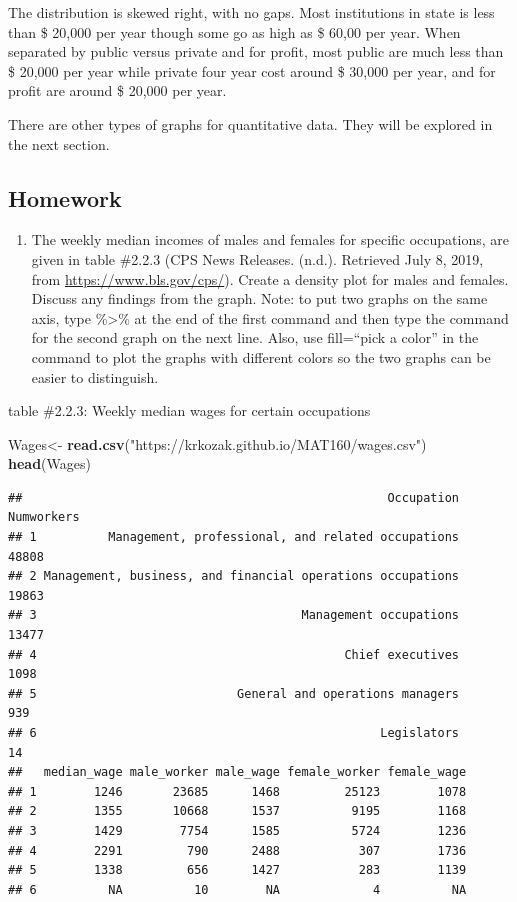 \documentclass[
]{book}
\newenvironment{Shaded}{\begin{snugshade}}{\end{snugshade}}
\newcommand{\KeywordTok}[1]{\textcolor[rgb]{0.13,0.29,0.53}{\textbf{#1}}}
\newcommand{\NormalTok}[1]{#1}
\newcommand{\StringTok}[1]{\textcolor[rgb]{0.31,0.60,0.02}{#1}}
\providecommand{\tightlist}{%
  \setlength{\itemsep}{0pt}\setlength{\parskip}{0pt}}
\begin{document}
The distribution is skewed right, with no gaps. Most institutions in state is less than \$ 20,000 per year though some go as high as \$ 60,00 per year. When separated by public versus private and for profit, most public are much less than \$ 20,000 per year while private four year cost around \$ 30,000 per year, and for profit are around \$ 20,000 per year.

There are other types of graphs for quantitative data. They will be explored in the next section.

\hypertarget{homework-1}{%
\subsection{Homework}\label{homework-1}}

\begin{enumerate}
\def\labelenumi{\arabic{enumi}.}
\tightlist
\item
  The weekly median incomes of males and females for specific occupations, are given in table \#2.2.3 (CPS News Releases. (n.d.). Retrieved July 8, 2019, from \url{https://www.bls.gov/cps/}). Create a density plot for males and females. Discuss any findings from the graph. Note: to put two graphs on the same axis, type \%\textgreater\% at the end of the first command and then type the command for the second graph on the next line. Also, use fill=``pick a color'' in the command to plot the graphs with different colors so the two graphs can be easier to distinguish.
\end{enumerate}

table \#2.2.3: Weekly median wages for certain occupations

\begin{Shaded}
\begin{Highlighting}[]
\NormalTok{Wages<-}\StringTok{ }\KeywordTok{read.csv}\NormalTok{(}\StringTok{"https://krkozak.github.io/MAT160/wages.csv"}\NormalTok{)}
\KeywordTok{head}\NormalTok{(Wages)}
\end{Highlighting}
\end{Shaded}

\begin{verbatim}
##                                                   Occupation Numworkers
## 1          Management, professional, and related occupations      48808
## 2 Management, business, and financial operations occupations      19863
## 3                                     Management occupations      13477
## 4                                           Chief executives       1098
## 5                            General and operations managers        939
## 6                                                Legislators         14
##   median_wage male_worker male_wage female_worker female_wage
## 1        1246       23685      1468         25123        1078
## 2        1355       10668      1537          9195        1168
## 3        1429        7754      1585          5724        1236
## 4        2291         790      2488           307        1736
## 5        1338         656      1427           283        1139
## 6          NA          10        NA             4          NA
\end{verbatim}
\end{document}
